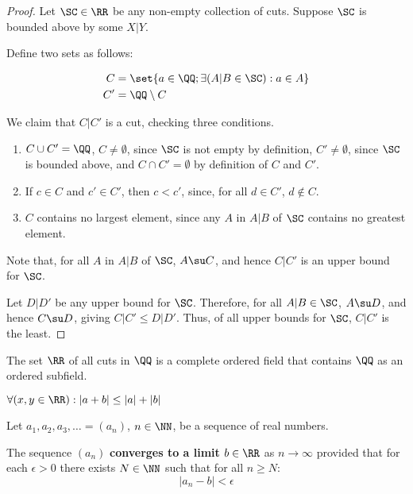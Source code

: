 \documentclass[11pt]{scrartcl}
\begin{document}
\begin{proof}
  Let \(\SC\in\RR\) be any non-empty collection of cuts. Suppose
  \(\SC\) is bounded above by some \(X|Y\).\vv

  Define two sets as follows:

  \begin{align}
    C  &= \set{a\in\QQ; \exists(A|B\in\SC):a\in A}\\
    C' &= \QQ\setminus C
  \end{align}

  We claim that \(C|C'\) is a cut, checking three conditions.\vv

  \begin{enumerate}[label=(\alph*)]
  \item $C\cup C' = \QQ$, \(C \neq \emptyset\), since \(\SC\) is not
    empty by definition, \( C' \neq \emptyset\), since \(\SC\) is
    bounded above, and \(C\cap C' = \emptyset\) by definition of \(C\)
    and \(C'\).
  \item If $c\in C$ and $c'\in C'$, then $c<c'$, since, for all
    \(d\in C'\), \(d\not\in C\).
  \item $C$ contains no largest element, since any \(A\) in
    \(A|B\) of \(\SC\) contains no greatest element.
  \end{enumerate}

  Note that, for all \(A\) in \(A|B\) of \(\SC\), \(A\su C\), and
  hence \(C|C'\) is an upper bound for \(\SC\).

  Let \(D|D'\) be any upper bound for \(\SC\). Therefore, for all
  \(A|B \in \SC\), \(A\su D\), and hence \(C\su D\), giving
  \(C|C'\leq D|D'\). Thus, of all upper bounds for \(\SC\), \(C|C'\)
  is the least.
  
\end{proof}

\begin{theorem}
  The set $\RR$ of all cuts in $\QQ$ is a complete ordered field that
  contains $\QQ$ as an ordered subfield.
\end{theorem}
\begin{theorem}
  $\forall(x,y\in\RR): |a+b| \leq |a| + |b|$
\end{theorem}

\begin{definition}
  Let $a_1, a_2, a_3, \dots = (a_n)$, $n\in\NN$, be a sequence of real numbers.\vv

  The sequence $(a_n)$ \textbf{converges to a limit} $b\in\RR$ as
  $n\to\infty$ provided that for each $\epsilon > 0$ there exists
  $N\in \NN$ such that for all $n\geq N$:
  \[|a_n-b| < \epsilon \]
\end{definition}
\end{document}

